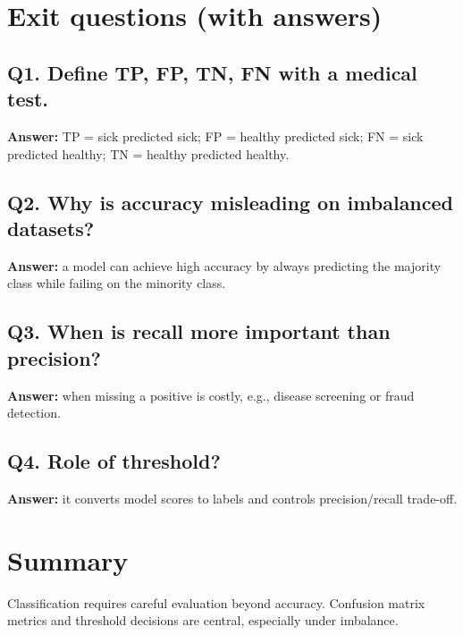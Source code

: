 \documentclass[11pt]{article}
\begin{document}
\section{Exit questions (with answers)}

\subsection*{Q1. Define TP, FP, TN, FN with a medical test.}
\textbf{Answer:} TP = sick predicted sick; FP = healthy predicted sick; FN = sick predicted healthy; TN = healthy predicted healthy.

\subsection*{Q2. Why is accuracy misleading on imbalanced datasets?}
\textbf{Answer:} a model can achieve high accuracy by always predicting the majority class while failing on the minority class.

\subsection*{Q3. When is recall more important than precision?}
\textbf{Answer:} when missing a positive is costly, e.g., disease screening or fraud detection.

\subsection*{Q4. Role of threshold?}
\textbf{Answer:} it converts model scores to labels and controls precision/recall trade-off.

\section{Summary}
Classification requires careful evaluation beyond accuracy. Confusion matrix metrics and threshold decisions are central, especially under imbalance.
\notesources{\AIMLUnitIVSources}
\end{document}
